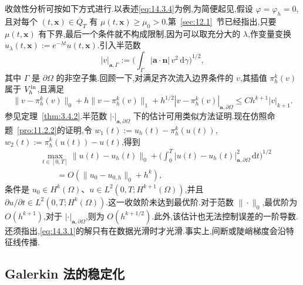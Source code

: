 收敛性分析可按如下方式进行.以表述\eqref{eq:14.3.4}为例,为简便起见,假设 \(\varphi=\varphi_h=0\),且对每个 \((t,\boldsymbol{x})\in\overline Q_T\) 有 \(\mu(t,\boldsymbol{x})\ge\mu_0>0\).第~\ref{sec:12.1}~节已经指出,只要 \(\mu(t,\boldsymbol{x})\) 有下界,最后一个条件就不构成限制,因为可以取充分大的 \(\lambda\),作变量变换 \(u_\lambda(t,\boldsymbol{x}):=e^{-\lambda t}u(t,\boldsymbol{x})\).引入半范数
\begin{equation}\label{eq:14.3.14}
  |v|_{\boldsymbol{a},\Gamma}:=\biggl(\int_\Gamma|\boldsymbol{a}\cdot\boldsymbol{n}|\,v^2\,\mathrm d\gamma\biggr)^{1/2},
\end{equation}
其中 \(\Gamma\) 是 \(\partial\Omega\) 的非空子集.回顾一下,对满足齐次流入边界条件的 \(v\),其插值 \(\pi_h^k(v)\) 属于 \(V_h^{\rm in}\),且满足
\begin{equation}\label{eq:14.3.15}
  \|v-\pi_h^k(v)\|_0+h\|v-\pi_h^k(v)\|_1
    +h^{1/2}|v-\pi_h^k(v)|_{\boldsymbol{a},\partial\Omega}\le Ch^{k+1}|v|_{k+1}.
\end{equation}
参见定理~\ref{thm:3.4.2}.半范数 \(|\cdot|_{\boldsymbol{a},\partial\Omega}\) 下的估计可用类似方法证明.现在仿照命题~\ref{pro:11.2.2}的证明,令 \(w_1(t):=u_h(t)-\pi_h^k(u(t))\),\(w_2(t):=\pi_h^k(u(t))-u(t)\),得到
\begin{equation}\label{eq:14.3.16}
  \begin{aligned}
    &\max_{t\in[0,T]}\|u(t)-u_h(t)\|_0
         +\biggl(\int_0^T|u(t)-u_h(t)|_{\boldsymbol{a},\partial\Omega}^2\,\mathrm dt\biggr)^{1/2}\\
    &\qquad=O(\|u_0-u_{0,h}\|_0+h^k),
  \end{aligned}
\end{equation}
条件是 \(u_0\in H^k(\Omega)\)、\(u\in L^2(0,T;H^{k+1}(\Omega))\),并且 \(\partial u/\partial t\in L^2(0,T;H^k(\Omega))\).这一收敛阶未达到最优阶.对于范数 \(\|\cdot\|_0\),最优阶为 \(O(h^{k+1})\),对于 \(|\cdot|_{\boldsymbol{a},\partial\Omega}\),则为 \(O(h^{k+1/2})\).此外,该估计也无法控制误差的一阶导数.还须指出,\eqref{eq:14.3.1}的解只有在数据光滑时才光滑.事实上,间断或陡峭梯度会沿特征线传播.

\subsection{Galerkin 法的稳定化}\label{sec:14.3.2}

